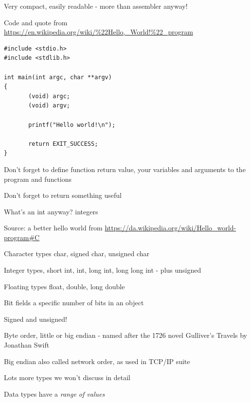 \documentclass[Screen16to9,17pt]{foils}
\begin{document}
\begin{list2}
\item Very compact, easily readable - more than assembler anyway!
\end{list2}

Code and quote from
\url{https://en.wikipedia.org/wiki/%22Hello,_World!%22_program}


\begin{verbatim}
#include <stdio.h>
#include <stdlib.h>

int main(int argc, char **argv)
{
       (void) argc;
       (void) argv;

       printf("Hello world!\n");

       return EXIT_SUCCESS;
}
\end{verbatim}

\begin{list2}
\item Don't forget to define function return value, your variables and arguments to the program and functions
\item Don't forget to return something useful
\item What's an int anyway? integers
\end{list2}

Source: a better hello world from \url{https://da.wikipedia.org/wiki/Hello_world-program#C}


\begin{list2}
\item Character types char, signed char, unsigned char
\item Integer types, short int, int, long int, long long int - plus unsigned
\item Floating types float, double, long double
\item Bit fields a specific number of bits in an object
\item Signed and unsigned!
\item Byte order, little or big endian - named after the 1726 novel Gulliver's Travels by Jonathan Swift
\item Big endian also called network order, as used in TCP/IP suite
\item Lots more types we won't discuss in detail
\end{list2}

Data types have a \emph{range of values}
\end{document}
